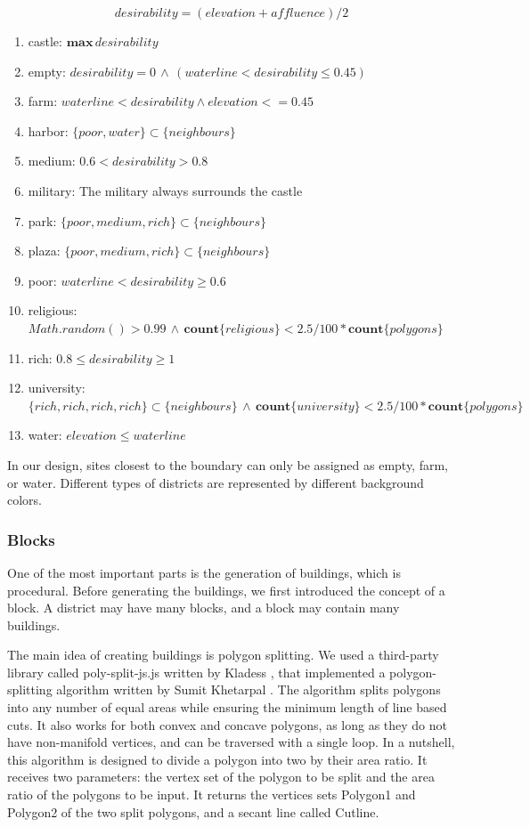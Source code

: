 \[ desirability = (elevation + affluence) / 2 \]

\begin{enumerate}
  \item castle: $\mathbf{max}\,desirability$
  \item empty: $desirability = 0 \, \wedge \, (waterline < desirability \leq 0.45)$
  \item farm: $waterline < desirability \wedge elevation <= 0.45$
  \item harbor: $\{poor, water\} \subset \{neighbours\}$
  \item medium: $0.6 < desirability > 0.8$
  \item military: The military always surrounds the castle
  \item park: $\{poor, medium, rich\} \subset \{neighbours\}$
  \item plaza: $\{poor, medium, rich\} \subset \{neighbours\}$
  \item poor: $waterline < desirability \geq 0.6$
  \item religious: $Math.random() > 0.99 \, \wedge \, \mathbf{count} \{religious\} < 2.5 / 100 * \mathbf{count} \{polygons\}$
  \item rich: $0.8 \leq desirability \geq 1$
  \item university: $\{rich, rich, rich, rich\} \subset \{neighbours\} \, \wedge \, \mathbf{count} \{university\} < 2.5 / 100 * \mathbf{count} \{polygons\}$
  \item water: $elevation \leq waterline$
\end{enumerate}

In our design, sites closest to the boundary can only be assigned as empty, farm, or water. Different types of districts are represented by different background colors.

\subsubsection{Blocks}
One of the most important parts is the generation of buildings, which is procedural. Before generating the buildings, we first introduced the concept of a block. A district may have many blocks, and a block may contain many buildings.

The main idea of creating buildings is polygon splitting. We used a third-party library called poly-split-js.js written by Kladess \cite{web:Poly-split-js}, that implemented a polygon-splitting algorithm written by Sumit Khetarpal \cite{web:Polygon-splitting}. The algorithm splits polygons into any number of equal areas while ensuring the minimum length of line based cuts. It also works for both convex and concave polygons, as long as they do not have non-manifold vertices, and can be traversed with a single loop. In a nutshell, this algorithm is designed to divide a polygon into two by their area ratio. It receives two parameters: the vertex set of the polygon to be split and the area ratio of the polygons to be input. It returns the vertices sets Polygon1 and Polygon2 of the two split polygons, and a secant line called Cutline.

